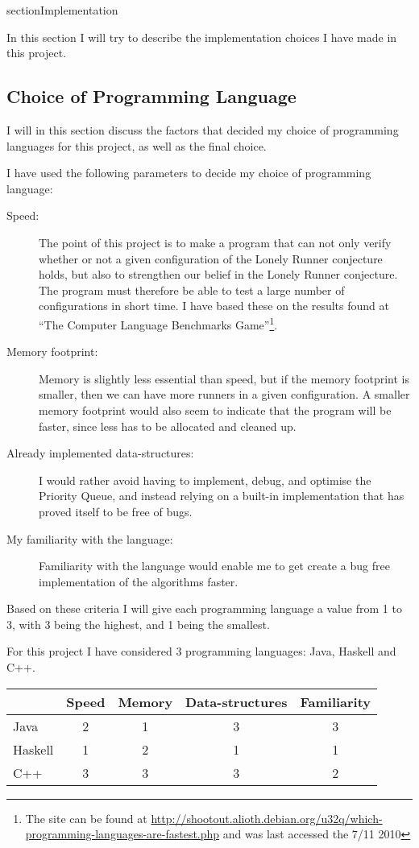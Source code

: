 section{Implementation}
\label{implementation}

In this section I will try to describe the implementation choices I have made in this project.

\subsection{Choice of Programming Language}
I will in this section discuss the factors that decided my choice of programming languages for this project, as well as the final choice.

I have used the following parameters to decide my choice of programming language:
\begin{description}
\item[Speed:] The point of this project is to make a program that can not only verify whether or not a given configuration of the Lonely Runner conjecture holds, but also to strengthen our belief in the Lonely Runner conjecture. The program must therefore be able to test a large number of configurations in short time. I have based these on the results found at ``The Computer Language Benchmarks Game''\footnote{The site can be found at \underline{http://shootout.alioth.debian.org/u32q/which-programming-languages-are-fastest.php} and was last accessed the 7/11 2010}.
\item[Memory footprint:] Memory is slightly less essential than speed, but if the memory footprint is smaller, then we can have more runners in a given configuration. A smaller memory footprint would also seem to indicate that the program will be faster, since less has to be allocated and cleaned up. 
\item[Already implemented data-structures:] I would rather avoid having to implement, debug, and optimise the Priority Queue, and instead relying on a built-in implementation that has proved itself to be free of bugs.
\item[My familiarity with the language:] Familiarity with the language would enable me to get create a bug free implementation of the algorithms faster.
\end{description}

Based on these criteria I will give each programming language a value from 1 to 3, with 3 being the highest, and 1 being the smallest. 

For this project I have considered 3 programming languages: Java, Haskell and C++.

\begin{tabular}{l|c|c|c|c}
        & Speed & Memory & Data-structures & Familiarity \\
\hline
Java    & 2     &  1     &  3              &   3  \\
Haskell & 1     &  2     &  1              &   1  \\
C++     & 3     &  3     &  3              &   2  \\
\end{tabular}

